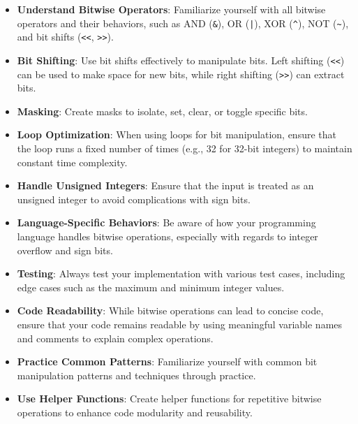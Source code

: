 \begin{itemize}
    \item \textbf{Understand Bitwise Operators}: Familiarize yourself with all bitwise operators and their behaviors, such as AND (\texttt{\&}), OR (\texttt{|}), XOR (\texttt{\^}), NOT (\texttt{\~}), and bit shifts (\texttt{<<}, \texttt{>>}).
    
    \item \textbf{Bit Shifting}: Use bit shifts effectively to manipulate bits. Left shifting (\texttt{<<}) can be used to make space for new bits, while right shifting (\texttt{>>}) can extract bits.
    
    \item \textbf{Masking}: Create masks to isolate, set, clear, or toggle specific bits.
    
    \item \textbf{Loop Optimization}: When using loops for bit manipulation, ensure that the loop runs a fixed number of times (e.g., 32 for 32-bit integers) to maintain constant time complexity.
    
    \item \textbf{Handle Unsigned Integers}: Ensure that the input is treated as an unsigned integer to avoid complications with sign bits.
    
    \item \textbf{Language-Specific Behaviors}: Be aware of how your programming language handles bitwise operations, especially with regards to integer overflow and sign bits.
    
    \item \textbf{Testing}: Always test your implementation with various test cases, including edge cases such as the maximum and minimum integer values.
    
    \item \textbf{Code Readability}: While bitwise operations can lead to concise code, ensure that your code remains readable by using meaningful variable names and comments to explain complex operations.
    
    \item \textbf{Practice Common Patterns}: Familiarize yourself with common bit manipulation patterns and techniques through practice.
    
    \item \textbf{Use Helper Functions}: Create helper functions for repetitive bitwise operations to enhance code modularity and reusability.
\end{itemize}

